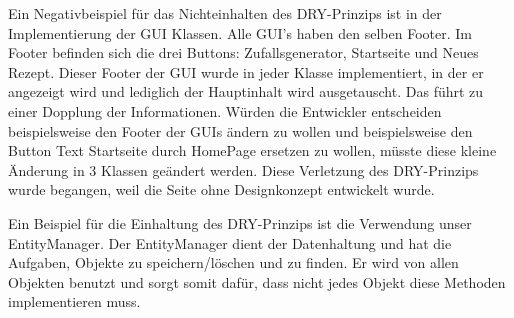 Ein Negativbeispiel für das Nichteinhalten des DRY-Prinzips ist in der Implementierung der GUI Klassen. Alle GUI's haben den selben Footer. Im Footer befinden sich die drei Buttons: Zufallsgenerator, Startseite und Neues Rezept. Dieser Footer der GUI wurde in jeder Klasse implementiert, in der er angezeigt wird und lediglich der Hauptinhalt wird ausgetauscht. Das führt zu einer Dopplung der Informationen. Würden die Entwickler entscheiden beispielsweise den Footer der GUIs ändern zu wollen und beispielsweise den Button Text Startseite durch HomePage ersetzen zu wollen, müsste diese kleine Änderung in 3 Klassen geändert werden. Diese Verletzung des DRY-Prinzips wurde begangen, weil die Seite ohne Designkonzept entwickelt wurde.  

Ein Beispiel für die Einhaltung des DRY-Prinzips ist die Verwendung unser EntityManager. Der EntityManager dient der Datenhaltung und hat die Aufgaben, Objekte zu speichern/löschen und zu finden. Er wird von allen Objekten benutzt und sorgt somit dafür, dass nicht jedes Objekt diese Methoden implementieren muss. 

